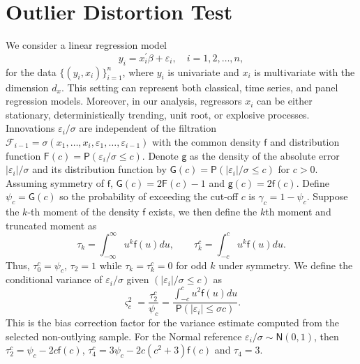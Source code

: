 \documentclass[11pt, letterpaper]{article}
\numberwithin{algorithm}{section}
\numberwithin{assumption}{section}
\numberwithin{lemma}{section}
\numberwithin{theorem}{section}
\numberwithin{corollary}{section}
\numberwithin{remark}{section}
\numberwithin{equation}{section}
\numberwithin{figure}{section}
\numberwithin{table}{section}
\begin{document}
\section{Outlier Distortion Test} \label{sec_theory and methods}
We consider a linear regression model
\begin{equation} \label{regression model}
y_{i} = x_{i}^{\prime} \beta + \varepsilon_{i}, \quad i = 1, 2, \ldots, n,
\end{equation}
for the data $\{ (y_{i}, x_{i}) \}_{i = 1}^{n}$, where $y_{i}$ is univariate and $x_{i}$ is multivariate with the dimension $d_{x}$. This setting can represent both classical, time series, and panel regression models. Moreover, in our analysis, regressors $x_{i}$ can be either stationary, deterministically trending, unit root, or explosive processes. Innovations $\varepsilon_{i} / \sigma$ are independent of the filtration $\mathcal{F}_{i-1} = \sigma(x_{1}, \ldots, x_{i}, \varepsilon_{1}, \ldots, \varepsilon_{i-1})$ with the common density $\mathsf{f}$ and distribution function $\mathsf{F}(c) = \mathsf{P}(\varepsilon_{i}/\sigma \le c)$. Denote $\mathsf{g}$ as the density of the absolute error $|\varepsilon_{i}| / \sigma$ and its distribution function by $\mathsf{G}(c) = \mathsf{P}(|\varepsilon_{i}| / \sigma \le c)$ for $c > 0$. Assuming symmetry of $\mathsf{f}$, $\mathsf{G}(c) = 2\mathsf{F}(c) - 1$ and $\mathsf{g}(c) = 2\mathsf{f}(c)$. Define $\psi_{c} = \mathsf{G}(c)$ so the probability of exceeding the cut-off $c$ is $\gamma_{c} = 1 - \psi_{c}$. Suppose the $k$-th moment of the density $\mathsf{f}$ exists, we then define the $k$th moment and truncated moment as
\begin{equation} \label{moments and truncated moments}
\tau_{k} = \int_{- \infty}^{\infty} u^{k} \mathsf{f}(u) du, \qquad \tau_{k}^{c} = \int_{-c}^{c} u^{k} \mathsf{f}(u) du.
\end{equation}
Thus, $\tau_{0}^{c} = \psi_{c}$, $\tau_{2} = 1$ while $\tau_{k} = \tau_{k}^{c} = 0$ for odd $k$ under symmetry. We define the conditional variance of $\varepsilon_{i}/\sigma$ given $( |\varepsilon_{i}|/\sigma \le c )$ as
\begin{equation} \label{bias correction factor}
\varsigma_{c}^{2} = \frac{\tau_{2}^{c}}{\psi_{c}} = \frac{\int_{-c}^{c} u^{2} \mathsf{f}(u) du}{\mathsf{P}(|\varepsilon_{i}| \le \sigma c)}.
\end{equation}
This is the bias correction factor for the variance estimate computed from the selected non-outlying sample. For the Normal reference $\varepsilon_{i} / \sigma \sim \mathsf{N}(0, 1)$, then $\tau_{2}^{c} = \psi_{c} - 2c\mathsf{f}(c)$, $\tau_{4}^{c} = 3 \psi_{c} - 2c(c^{2} + 3)\mathsf{f}(c)$ and $\tau_{4} = 3$.
\end{document}
